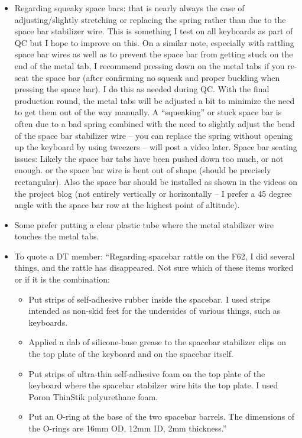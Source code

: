 \documentclass[a5paper, twoside]{memoir}
\begin{document}
\begin{enumerate}
\begin{itemize}
\item         Regarding squeaky space bars: that is nearly always the case of adjusting/slightly stretching or replacing the spring rather than due to the space bar stabilizer wire. This is something I test on all keyboards as part of QC but I hope to improve on this. On a similar note, especially with rattling space bar wires as well as to prevent the space bar from getting stuck on the end of the metal tab, I recommend pressing down on the metal tabs if you re-seat the space bar (after confirming no squeak and proper buckling when pressing the space bar). I do this as needed during QC. With the final production round, the metal tabs will be adjusted a bit to minimize the need to get them out of the way manually.  A “squeaking” or stuck space bar is often due to a bad spring combined with the need to slightly adjust the bend of the space bar stabilizer wire – you can replace the spring without opening up the keyboard by using tweezers – will post a video later. Space bar seating issues: Likely the space bar tabs have been pushed down too much, or not enough. or the space bar wire is bent out of shape (should be precisely rectangular). Also the space bar should be installed as shown in the videos on the project blog (not entirely vertically or horizontally – I prefer a 45 degree angle with the space bar row at the highest point of altitude).  
\item         Some prefer putting a clear plastic tube where the metal stabilizer wire touches the metal tabs.
\item         To quote a DT member:  “Regarding spacebar rattle on the F62, I did several things, and the rattle has disappeared. Not sure which of these items worked or if it is the combination:
\begin{itemize}
\item             Put strips of self-adhesive rubber inside the spacebar. I used strips intended as non-skid feet for the undersides of various things, such as keyboards.
\item             Applied a dab of silicone-base grease to the spacebar stabilizer clips on the top plate of the keyboard and on the spacebar itself.
\item             Put strips of ultra-thin self-adhesive foam on the top plate of the keyboard where the spacebar stabilzer wire hits the top plate. I used Poron ThinStik polyurethane foam.
\item             Put an O-ring at the base of the two spacebar barrels. The dimensions of the O-rings are 16mm OD, 12mm ID, 2mm thickness.”

\end{itemize}
\end{itemize}
\end{enumerate}
\end{document}
